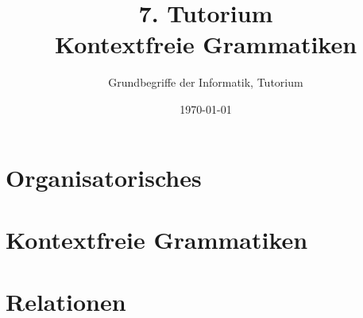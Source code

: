 




\title[Grammatiken]{7. Tutorium\\Kontextfreie Grammatiken}
\subtitle{Grundbegriffe der Informatik, Tutorium \hashtag\mytutnumber}
\date{\today}


\titleframe
\roadmap


\section{Organisatorisches}


\section{Kontextfreie Grammatiken}



\section{Relationen}



\section{}
\questionframe
\lastframe
{}

